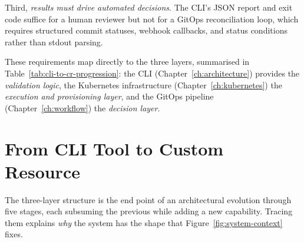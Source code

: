 Third, \textit{results must drive automated decisions}. The CLI's JSON report and exit code suffice for a human reviewer but not for a GitOps reconciliation loop, which requires structured commit statuses, webhook callbacks, and status conditions rather than stdout parsing.

These requirements map directly to the three layers, summarised in Table~\ref{tab:cli-to-cr-progression}: the CLI (Chapter~\ref{ch:architecture}) provides the \textit{validation logic}, the Kubernetes infrastructure (Chapter~\ref{ch:kubernetes}) the \textit{execution and provisioning layer}, and the GitOps pipeline (Chapter~\ref{ch:workflow}) the \textit{decision layer}.

\begin{table}[htbp]
\centering
\caption{The three abstraction layers of the system.}
\label{tab:cli-to-cr-progression}
\small
{}
\end{table}

\section{From CLI Tool to Custom Resource}
\label{sec:cli-to-cr-evolution}

The three-layer structure is the end point of an architectural evolution through five stages, each subsuming the previous while adding a new capability. Tracing them explains \emph{why} the system has the shape that Figure~\ref{fig:system-context} fixes.

